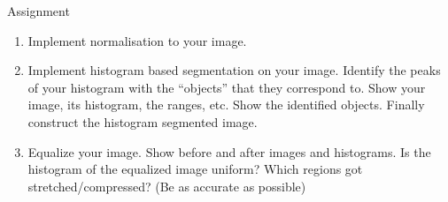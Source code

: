 %
%
\begin{frame}[allowframebreaks]{Assignment}
\begin{enumerate}
\item Implement normalisation to your image. 

\item Implement histogram based segmentation on your image.
Identify the peaks of your histogram with the ``objects'' that
they correspond to.
Show your image, its histogram, the ranges, etc.
Show the identified objects.
Finally construct the histogram segmented image.


\item Equalize your image.
Show before and after images and histograms.
Is the histogram of the equalized image uniform?
Which regions got stretched/compressed?
(Be as accurate as possible)

\end{enumerate}
\end{frame}
